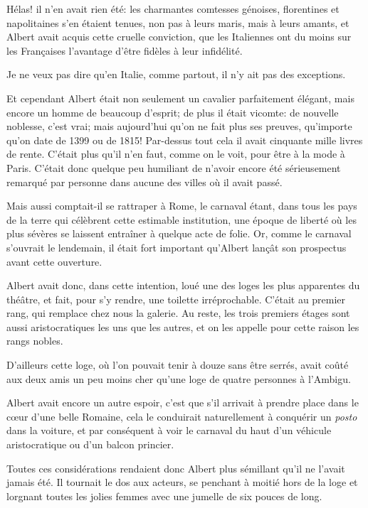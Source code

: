 Hélas! il n'en avait rien été: les charmantes comtesses génoises, florentines et napolitaines s'en étaient tenues, non pas à leurs maris, mais à leurs amants, et Albert avait acquis cette cruelle conviction, que les Italiennes ont du moins sur les Françaises l'avantage d'être fidèles à leur infidélité. 

Je ne veux pas dire qu'en Italie, comme partout, il n'y ait pas des exceptions. 

Et cependant Albert était non seulement un cavalier parfaitement élégant, mais encore un homme de beaucoup d'esprit; de plus il était vicomte: de nouvelle noblesse, c'est vrai; mais aujourd'hui qu'on ne fait plus ses preuves, qu'importe qu'on date de 1399 ou de 1815! Par-dessus tout cela il avait cinquante mille livres de rente. C'était plus qu'il n'en faut, comme on le voit, pour être à la mode à Paris. C'était donc quelque peu humiliant de n'avoir encore été sérieusement remarqué par personne dans aucune des villes où il avait passé. 

Mais aussi comptait-il se rattraper à Rome, le carnaval étant, dans tous les pays de la terre qui célèbrent cette estimable institution, une époque de liberté où les plus sévères se laissent entraîner à quelque acte de folie. Or, comme le carnaval s'ouvrait le lendemain, il était fort important qu'Albert lançât son prospectus avant cette ouverture. 

Albert avait donc, dans cette intention, loué une des loges les plus apparentes du théâtre, et fait, pour s'y rendre, une toilette irréprochable. C'était au premier rang, qui remplace chez nous la galerie. Au reste, les trois premiers étages sont aussi aristocratiques les uns que les autres, et on les appelle pour cette raison les rangs nobles. 

D'ailleurs cette loge, où l'on pouvait tenir à douze sans être serrés, avait coûté aux deux amis un peu moins cher qu'une loge de quatre personnes à l'Ambigu. 

Albert avait encore un autre espoir, c'est que s'il arrivait à prendre place dans le cœur d'une belle Romaine, cela le conduirait naturellement à conquérir un \textit{posto} dans la voiture, et par conséquent à voir le carnaval du haut d'un véhicule aristocratique ou d'un balcon princier. 

Toutes ces considérations rendaient donc Albert plus sémillant qu'il ne l'avait jamais été. Il tournait le dos aux acteurs, se penchant à moitié hors de la loge et lorgnant toutes les jolies femmes avec une jumelle de six pouces de long. 

